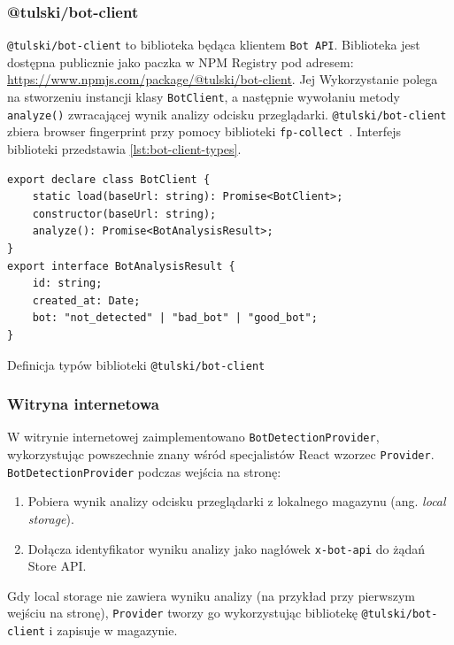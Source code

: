 \subsubsection{@tulski/bot-client}

\texttt{@tulski/bot-client} to biblioteka będąca klientem \texttt{Bot API}.
Biblioteka jest dostępna publicznie jako paczka w NPM Registry pod adresem: \url{https://www.npmjs.com/package/@tulski/bot-client}.
Jej Wykorzystanie polega na stworzeniu instancji klasy \texttt{BotClient}, a następnie wywołaniu metody \texttt{analyze()} zwracającej wynik analizy odcisku przeglądarki.
\texttt{@tulski/bot-client} zbiera browser fingerprint przy pomocy biblioteki \texttt{fp-collect}~\cite{github-fp-collect}.
Interfejs biblioteki przedstawia \autoref{lst:bot-client-types}.

\begin{listing}[H]
    \begin{verbatim}
export declare class BotClient {
    static load(baseUrl: string): Promise<BotClient>;
    constructor(baseUrl: string);
    analyze(): Promise<BotAnalysisResult>;
}
export interface BotAnalysisResult {
    id: string;
    created_at: Date;
    bot: "not_detected" | "bad_bot" | "good_bot";
}
    \end{verbatim}
    \caption{Definicja typów biblioteki \texttt{@tulski/bot-client}}
    \label{lst:bot-client-types}
\end{listing}

\subsubsection{Witryna internetowa}

W witrynie internetowej zaimplementowano \texttt{BotDetectionProvider}, wykorzystując powszechnie znany wśród specjalistów React wzorzec \texttt{Provider}.
\texttt{BotDetectionProvider} podczas wejścia na stronę:
\begin{enumerate}
    \item Pobiera wynik analizy odcisku przeglądarki z lokalnego magazynu (ang. \emph{local storage}).
    \item Dołącza identyfikator wyniku analizy jako nagłówek \texttt{x-bot-api} do żądań Store API\@.
\end{enumerate}
Gdy local storage nie zawiera wyniku analizy (na przykład przy pierwszym wejściu na stronę), \texttt{Provider} tworzy go wykorzystując bibliotekę \texttt{@tulski/bot-client} i zapisuje w magazynie.

